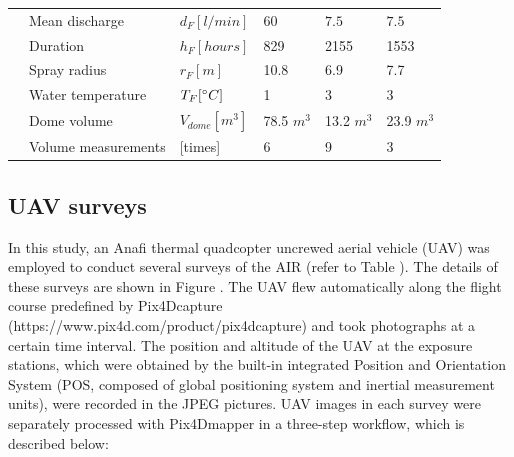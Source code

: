 \documentclass[utf8]{frontiersSCNS} %
\begin{document}
\begin{table}
\begin{tabular}{@{}|llllll|@{}}
		\multicolumn{1}{|l|}{\multirow{4}{*}{\rotatebox[origin=c]{90}{Fountain}}}
		                       & Mean discharge              & $d_F [l/min]     $        & $60$          & $7.5$         & $7.5$         \\
		\multicolumn{1}{|l|}{} & Duration                    & $h_F [hours]$             & 829           & 2155          & 1553          \\
		\multicolumn{1}{|l|}{} & Spray radius                & $r_{F} [m]$               & 10.8          & 6.9           & 7.7           \\
		\multicolumn{1}{|l|}{} & Water temperature           & $T_{F} [\degree C]$       & 1             & 3             & 3             \\\midrule
		\multicolumn{1}{|l|}{\multirow{2}{*}{\rotatebox[origin=c]{90}{UAV}}}
		                       & Dome volume                 & $V_{dome}[m^{3}]$         & 78.5 $m^{3}$  & 13.2 $m^{3}$  & 23.9 $m^{3}$  \\
		\multicolumn{1}{|l|}{} & Volume measurements         & [times]                   & 6             & 9             & 3
		\\\bottomrule
	\end{tabular}
\end{table}

\subsection{UAV surveys}
In this study, an Anafi thermal quadcopter uncrewed aerial vehicle (UAV) was employed to conduct several surveys of the
AIR (refer to Table ).  The details of these surveys are shown in Figure . The UAV flew automatically along the flight
course predefined by Pix4Dcapture (https://www.pix4d.com/product/pix4dcapture) and took photographs at a certain time
interval. The position and altitude of the UAV at the exposure stations, which were obtained by the built-in integrated
Position and Orientation System (POS, composed of global positioning system and inertial measurement units), were
recorded in the JPEG pictures. UAV images in each survey were separately processed with Pix4Dmapper in a three-step
workflow, which is described below:
\end{document}
